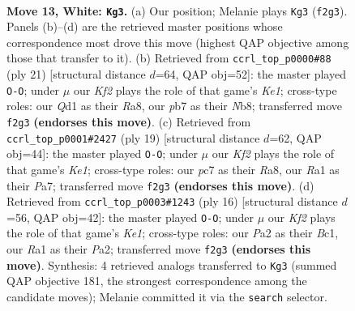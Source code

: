 \documentclass[11pt]{article}
\begin{document}
\begin{figure}[p]
\label{fig:thought-m22}
\end{figure}

\clearpage

\begin{figure}[p]\centering
\begin{subfigure}{0.46\textwidth}\centering
\resizebox{\linewidth}{!}{%
\newchessgame
\chessboard[
  setfen={2b1qrk1/rppnnppp/p3p3/3pP3/3P1P2/2N5/PPP2KPP/R2Q1BNR w - - 10 13},
  showmover=false,
  pgfstyle=straightmove, color=movearrow, markmove={f2-g3}
]}
\caption{}
\end{subfigure}\hfill
\begin{subfigure}{0.46\textwidth}\centering
\resizebox{\linewidth}{!}{%
\newchessgame
\chessboard[
  setfen={rn2k2r/1p1qbpp1/p6p/2ppP3/P3nN2/5N2/1PPP2PP/R1BQ1RK1 b kq - 1 11},
  showmover=false,
  pgfstyle=straightmove, color=movearrow, markmove={e8-g8}
]}
\caption{}
\end{subfigure}
\\[4pt]
\begin{subfigure}{0.46\textwidth}\centering
\resizebox{\linewidth}{!}{%
\newchessgame
\chessboard[
  setfen={r1bqk2r/p2nbppp/2p1p3/2ppP3/5P2/2NP1N2/PPP3PP/R1B1QRK1 b kq - 2 10},
  showmover=false,
  pgfstyle=straightmove, color=movearrow, markmove={e8-g8}
]}
\caption{}
\end{subfigure}\hfill
\begin{subfigure}{0.46\textwidth}\centering
\resizebox{\linewidth}{!}{%
\newchessgame
\chessboard[
  setfen={rnbq1rk1/pp3pbp/2pp1np1/8/2PNP3/2N3P1/PP3PBP/R1BQK2R w KQ - 1 9},
  showmover=false,
  pgfstyle=straightmove, color=movearrow, markmove={e1-g1}
]}
\caption{}
\end{subfigure}
\caption{\textbf{Move 13, White: \texttt{Kg3}.} (a) Our position; Melanie plays \texttt{Kg3} (\texttt{f2g3}). Panels (b)--(d) are the retrieved master positions whose correspondence most drove this move (highest QAP objective among those that transfer to it). (b) Retrieved from \texttt{ccrl\_top\_p0000\#88} (ply 21) [structural distance $d$=64, QAP obj=52]: the master played \texttt{O-O}; under $\mu$ our \emph{Kf2} plays the role of that game's \emph{Ke1}; cross-type roles: our \emph{Q}d1 as their \emph{R}a8, our \emph{p}b7 as their \emph{N}b8; transferred move \texttt{f2g3} \textbf{(endorses this move)}. (c) Retrieved from \texttt{ccrl\_top\_p0001\#2427} (ply 19) [structural distance $d$=62, QAP obj=44]: the master played \texttt{O-O}; under $\mu$ our \emph{Kf2} plays the role of that game's \emph{Ke1}; cross-type roles: our \emph{p}c7 as their \emph{R}a8, our \emph{R}a1 as their \emph{P}a7; transferred move \texttt{f2g3} \textbf{(endorses this move)}. (d) Retrieved from \texttt{ccrl\_top\_p0003\#1243} (ply 16) [structural distance $d$=56, QAP obj=42]: the master played \texttt{O-O}; under $\mu$ our \emph{Kf2} plays the role of that game's \emph{Ke1}; cross-type roles: our \emph{P}a2 as their \emph{B}c1, our \emph{R}a1 as their \emph{P}a2; transferred move \texttt{f2g3} \textbf{(endorses this move)}. Synthesis: 4 retrieved analogs transferred to \texttt{Kg3} (summed QAP objective 181, the strongest correspondence among the candidate moves); Melanie committed it via the \texttt{search} selector.}

\end{figure}
\end{document}

